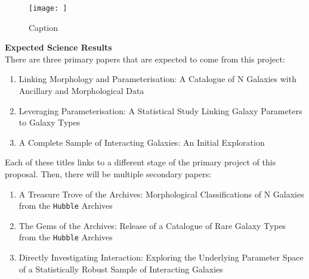 \documentclass[11pt,usenatbib]{article}
\begin{document}
\begin{figure}
    \centering
    \texttt{[image: ]}
    \caption{Caption}
    \label{fig:gantt-chart}
\end{figure}

\noindent\textbf{Expected Science Results} \\
\noindent There are three primary papers that are expected to come from this project:
\begin{enumerate}[itemsep=0pt, parsep=0pt, topsep=0pt]
    \item Linking Morphology and Parameterisation: A Catalogue of N Galaxies with Ancillary and Morphological Data
    \item Leveraging Parameterisation: A Statistical Study Linking Galaxy Parameters to Galaxy Types
    \item A Complete Sample of Interacting Galaxies: An Initial Exploration \\
\end{enumerate}

Each of these titles links to a different stage of the primary project of this proposal.
Then, there will be multiple secondary papers:
\begin{enumerate}[itemsep=0pt, parsep=0pt, topsep=0pt]
    \item A Treasure Trove of the Archives: Morphological Classifications of N Galaxies from the \texttt{Hubble} Archives
    \item The Gems of the Archives: Release of a Catalogue of Rare Galaxy Types from the \texttt{Hubble} Archives
    \item Directly Investigating Interaction: Exploring the Underlying Parameter Space of a Statistically Robust Sample of Interacting Galaxies
\end{enumerate}

\vspace{-3mm}



\end{document}
